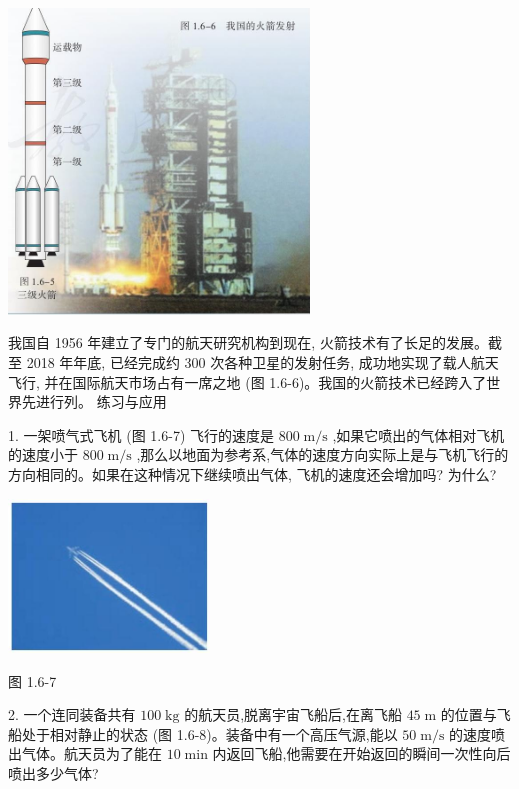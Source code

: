 \documentclass[10pt]{article}
\begin{document}
\begin{center}
\includegraphics[max width=0.6\textwidth]{images/01910e4c-ebb8-7d2c-8f2f-2375bc1d2d12_32_329104.jpg}
\end{center}

我国自 1956 年建立了专门的航天研究机构到现在, 火箭技术有了长足的发展。截至 2018 年年底, 已经完成约 300 次各种卫星的发射任务, 成功地实现了载人航天飞行, 并在国际航天市场占有一席之地 (图 1.6-6)。我国的火箭技术已经跨入了世界先进行列。 练习与应用

1. 一架喷气式飞机 (图 1.6-7) 飞行的速度是 \({800}\mathrm{\;m}/\mathrm{s}\) ,如果它喷出的气体相对飞机的速度小于 \({800}\mathrm{\;m}/\mathrm{s}\) ,那么以地面为参考系,气体的速度方向实际上是与飞机飞行的方向相同的。如果在这种情况下继续喷出气体, 飞机的速度还会增加吗? 为什么?

\begin{center}
\includegraphics[max width=0.4\textwidth]{images/01910e4c-ebb8-7d2c-8f2f-2375bc1d2d12_33_409976.jpg}
\end{center}

图 1.6-7

2. 一个连同装备共有 \({100}\mathrm{\;{kg}}\) 的航天员,脱离宇宙飞船后,在离飞船 \({45}\mathrm{\;m}\) 的位置与飞船处于相对静止的状态 (图 1.6-8)。装备中有一个高压气源,能以 \({50}\mathrm{\;m}/\mathrm{s}\) 的速度喷出气体。航天员为了能在 \({10}\mathrm{\;{min}}\) 内返回飞船,他需要在开始返回的瞬间一次性向后喷出多少气体?
\end{document}

